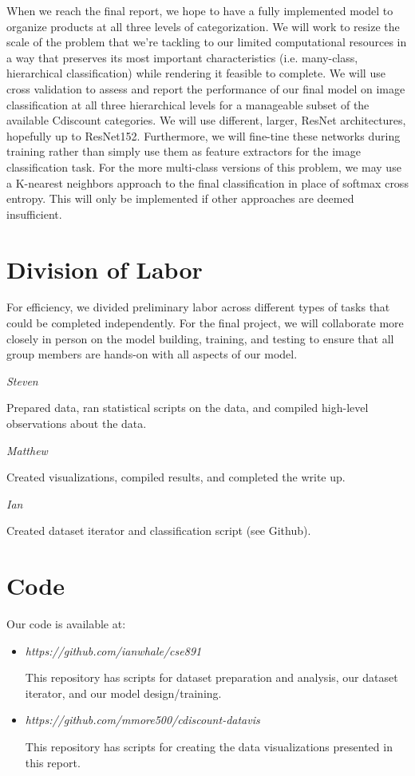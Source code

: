 \documentclass[10pt,twocolumn,letterpaper]{article}
\begin{document}
When we reach the final report, we hope to have a fully implemented model to organize products at all three levels of categorization.
We will work to resize the scale of the problem that we're tackling to our limited computational resources in a way that preserves its most important characteristics (i.e. many-class, hierarchical classification) while rendering it feasible to complete. 
We will use cross validation to assess and report the performance of our final model on image classification at all three hierarchical levels for a manageable subset of the available Cdiscount categories.
We will use different, larger, ResNet architectures, hopefully up to ResNet152. Furthermore, we will fine-tine these networks during training rather than simply use them as feature extractors for the image classification task. 
For the more multi-class versions of this problem, we may use a K-nearest neighbors approach to the final classification in place of softmax cross entropy. This will only be implemented if other approaches are deemed insufficient.

\section{Division of Labor}

For efficiency, we divided preliminary labor across different types of tasks that could be completed independently.
For the final project, we will collaborate more closely in person on the model building, training, and testing to ensure that all group members are hands-on with all aspects of our model. 

\textit{Steven}

Prepared data, ran statistical scripts on the data, and compiled high-level observations about the data. 

\textit{Matthew}

Created visualizations, compiled results, and completed the write up.

\textit{Ian}

Created dataset iterator and classification script (see Github). 

\section{Code}
Our code is available at:
\begin{itemize}
\item \textit{https://github.com/ianwhale/cse891}

This repository has scripts for dataset preparation and analysis, our dataset iterator, and our model design/training.
\item \textit{https://github.com/mmore500/cdiscount-datavis}

This repository has scripts for creating the data visualizations presented in this report.
\end{itemize}



{\small


}
\end{document}
